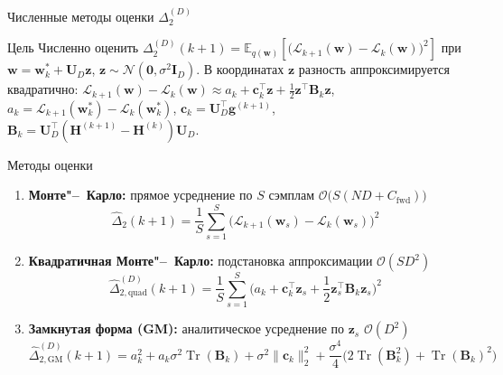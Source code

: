 \documentclass{beamer}
\begin{document}
\begin{frame}{Численные методы оценки $\Delta_2^{(D)}$}
    \small
    \begin{block}{Цель}
        Численно оценить $\Delta_{2}^{(D)}(k+1) = \mathbb{E}_{q(\mathbf{w})}\!\left[ \big( \mathcal{L}_{k+1}(\mathbf{w}) - \mathcal{L}_{k}(\mathbf{w}) \big)^2 \right]$ при $\mathbf{w} = \mathbf{w}_k^* + \mathbf{U}_{D} \mathbf{z}$, $\mathbf{z} \sim \mathcal{N}(\mathbf{0}, \sigma^2 \mathbf{I}_{D})$. В координатах $\mathbf z$ разность аппроксимируется квадратично: $\mathcal L_{k+1}(\mathbf w) - \mathcal L_k(\mathbf w) \approx a_k + \mathbf c_k^\top \mathbf z + \tfrac12 \mathbf z^\top \mathbf B_k \mathbf z$, $a_k = \mathcal L_{k+1}(\mathbf w_k^*) - \mathcal L_k(\mathbf w_k^*)$, $\mathbf c_k = \mathbf U_D^\top \mathbf g^{(k+1)}$, $\mathbf B_k = \mathbf U_D^\top(\mathbf H^{(k+1)} - \mathbf H^{(k)})\mathbf U_D$.
    \end{block}
    \begin{block}{Методы оценки}
        \begin{enumerate}
        \item \textbf{Монте"--~Карло:} прямое усреднение по $S$ сэмплам \hfill\alert{$\mathcal O\big(S(ND+C_{\mathrm{fwd}})\big)$}
        \vspace{-1.0em}
        \begin{equation*}
            \hat{\Delta}_{2}(k+1) = \dfrac{1}{S} \sum_{s=1}^{S} \big( \mathcal{L}_{k+1}(\mathbf{w}_s) - \mathcal{L}_{k}(\mathbf{w}_s) \big)^2
        \end{equation*}
        \vspace{-1.6em}
        \item \textbf{Квадратичная Монте"--~Карло:} подстановка аппроксимации \hfill\alert{$\mathcal O(SD^2)$}
        \vspace{-1.0em}
        \begin{equation*}
            \hat{\Delta}_{2,\mathrm{quad}}^{(D)}(k+1) = \dfrac{1}{S} \sum_{s=1}^{S} \big( a_k + \mathbf c_k^\top \mathbf z_s + \dfrac12 \mathbf z_s^\top \mathbf B_k \mathbf z_s \big)^2
        \end{equation*}
        \vspace{-1.6em}
        \item \textbf{Замкнутая форма (GM):} аналитическое усреднение по $\mathbf z_s$ \hfill\alert{$\mathcal O(D^2)$}
        \vspace{-1.0em}
        \begin{equation*}
            \hat{\Delta}_{2,\mathrm{GM}}^{(D)}(k+1) = a_k^2 + a_k \sigma^2 \operatorname{Tr}(\mathbf B_k) + \sigma^2 \|\mathbf c_k\|_2^2 + \dfrac{\sigma^4}{4}\big(2\operatorname{Tr}(\mathbf B_k^2) + \operatorname{Tr}(\mathbf B_k)^2\big)
        \end{equation*}
        \end{enumerate}
    \end{block}
\end{frame}
\end{document}
